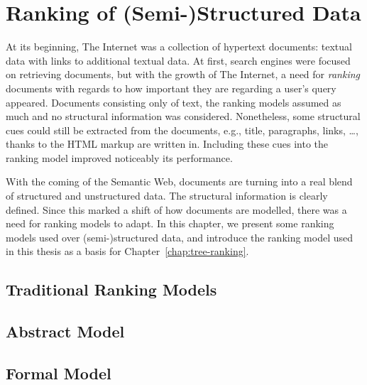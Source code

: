 \chapter{Ranking of (Semi-)Structured Data}

At its beginning, The Internet was a collection of hypertext documents: textual data with links to additional textual data. At first, search engines were focused on retrieving documents, but with the growth of The Internet, a need for \emph{ranking} documents with regards to how important they are regarding a user's query appeared. Documents consisting only of text, the ranking models assumed as much and no structural information was considered. Nonetheless, some structural cues could still be extracted from the documents, e.g., title, paragraphs, links, \ldots, thanks to the HTML markup are written in. Including these cues into the ranking model improved noticeably its performance.

With the coming of the Semantic Web, documents are turning into a real blend of structured and unstructured data. The structural information is clearly defined. Since this marked a shift of how documents are modelled, there was a need for ranking models to adapt. In this chapter, we present some ranking models used over (semi-)structured data, and introduce the ranking model used in this thesis as a basis for Chapter~\ref{chap:tree-ranking}.

\section{Traditional Ranking Models}

\section{Abstract Model}

\section{Formal Model}


